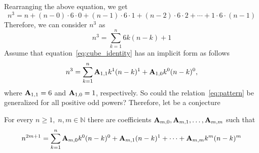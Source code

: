 Rearranging the above equation, we get
\[
    n^3 = n +(n-0) \cdot6 \cdot0 + (n-1)\cdot6\cdot1 + (n-2)\cdot6\cdot2 + \cdots+1\cdot6\cdot(n-1)
\]
Therefore, we can consider $n^3$ as
\begin{equation}
    \label{eq:cube_identity}
    n^3 = \sum_{k=1}^{n} 6k(n-k) + 1
\end{equation}
Assume that equation~\eqref{eq:cube_identity} has an implicit form as follows
\begin{equation}
    \label{eq:pattern}
    n^3 = \sum_{k=1}^{n} {\mathbf{A}} \sb{1,1} k^1(n-k)^1 + {\mathbf{A}} \sb{1,0} k^0(n-k)^0,
\end{equation}
where ${\mathbf{A}} \sb{1,1} = 6$ and ${\mathbf{A}} \sb{1,0} = 1$, respectively.
So could the relation~\eqref{eq:pattern} be generalized for all positive odd powers?
Therefore, let be a conjecture
\begin{conj}
    For every $n\geq 1, \; n,m\in\mathbb{N}$ there are coefficients ${\mathbf{A}} \sb{m,0}, {\mathbf{A}} \sb{m,1}, \ldots, {\mathbf{A}} \sb{m,m}$ such that
    \begin{equation*}
        \label{conjecture}
        n^{2m+1} = \sum_{k=1}^{n} {\mathbf{A}} \sb{m,0} k^0 (n-k)^0 + {\mathbf{A}} \sb{m,1} (n-k)^1
        + \cdots + {\mathbf{A}} \sb{m,m} k^m (n-k)^m
    \end{equation*}
\end{conj}